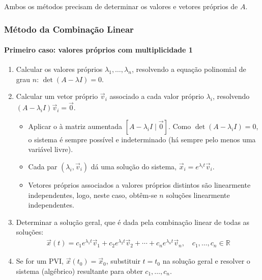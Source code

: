 \documentclass{article}
\begin{document}
Ambos os métodos precisam de determinar os valores e vetores próprios de $A$.

\subsubsection{Método da Combinação Linear}
\label{subsubsec: metodo-combinacao-linear}

\paragraph{Primeiro caso: valores próprios com multiplicidade 1}

\begin{enumerate}
    \item Calcular os valores próprios $\lambda_1, \ldots, \lambda_n$, resolvendo a equação polinomial de
    grau $n$: $\det(A - \lambda I) = 0$.

    \item Calcular um vetor próprio $\vec{v}_i$ associado a cada valor próprio $\lambda_i$, resolvendo
    $(A - \lambda_i I)\vec{v}_i = \vec{0}$.
    \begin{itemize}
        \item Aplicar o  à matriz aumentada
        $[A - \lambda_i I \mid \vec{0}]$. Como $\det(A - \lambda_i I) = 0$, o sistema é
        sempre possível e indeterminado (há sempre pelo menos uma variável livre).
        \item Cada par $(\lambda_i, \vec{v}_i)$ dá uma solução do sistema, $\vec{x}_i = e^{\lambda_i t}\vec{v}_i$.
        \item Vetores próprios associados a valores próprios distintos são linearmente independentes, logo,
        neste caso, obtêm-se $n$ soluções linearmente independentes.
    \end{itemize}

    \item Determinar a solução geral, que é dada pela combinação linear de todas as soluções:
    \begin{gather*}
    \boxed{\vec{x}(t) = c_1 e^{\lambda_1 t}\vec{v}_1 + c_2 e^{\lambda_2 t}\vec{v}_2 + \cdots
    + c_n e^{\lambda_n t}\vec{v}_n, \quad c_1, \ldots, c_n \in \mathbb{R}}
    \end{gather*}

    \item Se for um PVI, $\vec{x}(t_0) = \vec{x}_0$, substituir $t = t_0$ na solução geral e resolver o sistema
    (algébrico) resultante para obter $c_1, \ldots, c_n$.
\end{enumerate}
\end{document}

